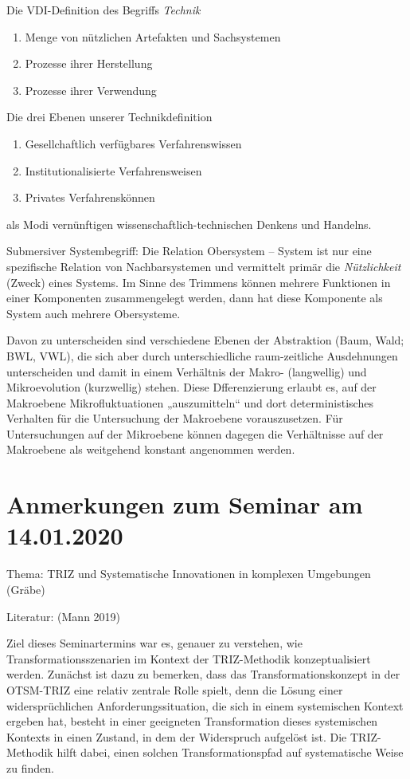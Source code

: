\documentclass[11pt,a4paper]{article}
\begin{document}
Die VDI-Definition des Begriffs \emph{Technik}
\begin{enumerate}[noitemsep]
\item Menge von nützlichen Artefakten und Sachsystemen
\item Prozesse ihrer Herstellung
\item Prozesse ihrer Verwendung
\end{enumerate}

Die drei Ebenen unserer Technikdefinition
\begin{enumerate}[noitemsep]
\item Gesellchaftlich verfügbares Verfahrenswissen
\item Institutionalisierte Verfahrensweisen
\item Privates Verfahrenskönnen
\end{enumerate}
als Modi vernünftigen wissenschaftlich-technischen Denkens und Handelns.

Submersiver Systembegriff: Die Relation Obersystem -- System ist nur eine
spezifische Relation von Nachbarsystemen und vermittelt primär die
\emph{Nützlichkeit} (Zweck) eines Systems. Im Sinne des Trimmens können
mehrere Funktionen in einer Komponenten zusammengelegt werden, dann hat diese
Komponente als System auch mehrere Obersysteme.

Davon zu unterscheiden sind verschiedene Ebenen der Abstraktion (Baum, Wald;
BWL, VWL), die sich aber durch unterschiedliche raum-zeitliche Ausdehnungen
unterscheiden und damit in einem Verhältnis der Makro- (langwellig) und
Mikroevolution (kurzwellig) stehen. Diese Dfferenzierung erlaubt es, auf der
Makroebene Mikrofluktuationen „auszumitteln“ und dort deterministisches
Verhalten für die Untersuchung der Makroebene vorauszusetzen. Für
Untersuchungen auf der Mikroebene können dagegen die Verhältnisse auf der
Makroebene als weitgehend konstant angenommen werden.

\section{ Anmerkungen zum Seminar am 14.01.2020}

Thema: TRIZ und Systematische Innovationen in komplexen Umgebungen (Gräbe)

Literatur: (Mann 2019)

Ziel dieses Seminartermins war es, genauer zu verstehen, wie
Transformationsszenarien im Kontext der TRIZ-Methodik konzeptualisiert werden.
Zunächst ist dazu zu bemerken, dass das Transformationskonzept in der
OTSM-TRIZ eine relativ zentrale Rolle spielt, denn die Lösung einer
widersprüchlichen Anforderungssituation, die sich in einem systemischen
Kontext ergeben hat, besteht in einer geeigneten Transformation dieses
systemischen Kontexts in einen Zustand, in dem der Widerspruch aufgelöst ist.
Die TRIZ-Methodik hilft dabei, einen solchen Transformationspfad auf
systematische Weise zu finden.
\end{document}
